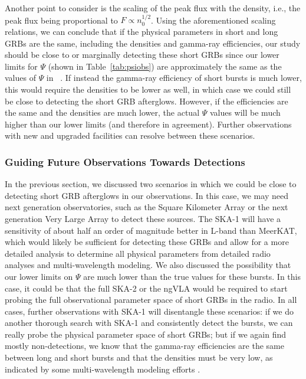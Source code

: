 \documentclass[12pt]{article}
\begin{document}
Another point to consider is the scaling of the peak flux with the density, i.e., the peak flux being proportional to $F\propto n_0^{1/2}$. Using the aforementioned scaling relations, we can conclude that if the physical parameters in short and long GRBs are the same, including the densities and gamma-ray efficiencies, our study should be close to or marginally detecting these short GRBs since our lower limits for $\Psi$ (shown in Table~\ref{tab:psiobs}) are approximately the same as the values of $\Psi$ in ~\citet{2023MNRAS.518.1522D}. If instead the gamma-ray efficiency of short bursts is much lower, this would require the densities to be lower as well, in which case we could still be close to detecting the short GRB afterglows. However, if the efficiencies are the same and the densities are much lower, the actual $\Psi$ values will be much higher than our lower limits (and therefore in agreement). Further observations with new and upgraded facilities can resolve between these scenarios. 


\subsubsection{Guiding Future Observations Towards Detections}

In the previous section, we discussed two scenarios in which we could be close to detecting short GRB afterglows in our observations. In this case, we may need next generation observatories, such as the Square Kilometer Array \citep[SKA;][]{2009IEEEP..97.1482D} or the next generation Very Large Array \citep[ngVLA;][]{2018ASPC..517....3M} to detect these sources. The SKA-1 will have a sensitivity of about half an order of magnitude better in L-band than MeerKAT, which would likely be sufficient for detecting these GRBs and allow for a more detailed analysis to determine all physical parameters from detailed radio analyses and multi-wavelength modeling. We also discussed the possibility that our lower limits on $\Psi$ are much lower than the true values for these bursts. In this case, it could be that the full SKA-2 or the ngVLA would be required to start probing the full observational parameter space of short GRBs in the radio. In all cases, further observations with SKA-1 will disentangle these scenarios: if we do another thorough search with SKA-1 and consistently detect the bursts, we can really probe the physical parameter space of short GRBs; but if we again find mostly non-detections, we know that the gamma-ray efficiencies are the same between long and short bursts and that the densities must be very low, as indicated by some multi-wavelength modeling efforts \citep[e.g.,][]{2015ApJ...815..102F}. 
\end{document}
